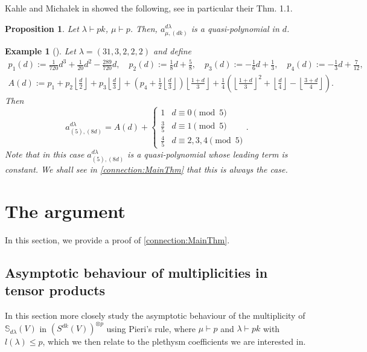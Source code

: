 \documentclass[a4paper]{amsart}
\newtheorem{proposition}{Proposition}
\newtheorem{example}{Example}
\begin{document}
Kahle and Micha\l ek in \cite{KM16} showed the following, see in particular their Thm. 1.1.
\begin{proposition}\label{plethysm:QuasiPolynomial}
	Let $\lambda\vdash pk$, $\mu\vdash p$.
	Then, $a_{\mu,(dk)}^{d\lambda}$ is a quasi-polynomial in $d$.
\end{proposition}
\begin{example}[{\cite[Ex. 1.3]{KM16}}]
	Let $\lambda=(31,3,2,2,2)$ and define
	\begin{align*}
		p_1(d):=\frac{1}{720}d^3+\frac{1}{20}d^2-\frac{289}{720}d,\quad
		p_2(d):=\frac{1}{8}d+\frac{5}{8},\quad
		p_3(d):=-\frac{1}{6}d+\frac{1}{3},\quad
		p_4(d):=-\frac{1}{3}d+\frac{7}{12},\\
		A(d):=p_1+p_2\left\lfloor\frac{d}{2}\right\rfloor+p_3\left\lfloor\frac{d}{3}\right\rfloor+\left(p_4+\frac{1}{2}\left\lfloor\frac{d}{3}\right\rfloor\right)\left\lfloor\frac{1+d}{3}\right\rfloor+\frac{1}{4}\left(\left\lfloor\frac{1+d}{3}\right\rfloor^2+\left\lfloor\frac{d}{4}\right\rfloor-\left\lfloor\frac{3+d}{4}\right\rfloor\right).
	\end{align*}
	Then
	\begin{displaymath}
		a_{(5),(8d)}^{d\lambda}=
		A(d)+
		\begin{cases}
			1&d\equiv0\pmod{5}\\
			\frac{3}{5}&d\equiv1\pmod{5}\\
			\frac{4}{5}&d\equiv2,3,4\pmod{5}
		\end{cases}.
	\end{displaymath}
	Note that in this case $a_{(5),(8d)}^{d\lambda}$ is a quasi-polynomial whose leading term is constant.
	We shall see in \cref{connection:MainThm} that this is always the case.
\end{example}
\section{The argument}
In this section, we provide a proof of \cref{connection:MainThm}.
\subsection{Asymptotic behaviour of multiplicities in tensor products}
In this section more closely study the asymptotic behaviour of the multiplicity of $\mathbb{S}_{d\lambda}(V)$ in $(S^{dk}(V))^{\otimes p}$ using Pieri's rule, where $\mu\vdash p$ and $\lambda\vdash pk$ with $l(\lambda)\leq p$,
which we then relate to the plethysm coefficients we are interested in.
\end{document}
